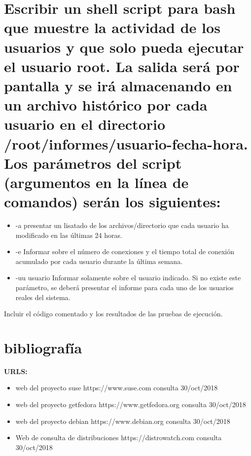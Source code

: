 \documentclass[preprint,11pt]{elsarticle}
\begin{document}
\clearpage
\section{Escribir un shell script para bash que muestre la actividad de los usuarios y que solo pueda ejecutar el usuario root. La salida será por pantalla y se irá almacenando en un archivo histórico por cada usuario en el directorio /root/informes/usuario-fecha-hora. Los parámetros del script (argumentos en la línea de comandos) serán los siguientes:}

\begin{itemize}
    \item-a presentar un lisatado de los archivos/directorio que cada usuario ha modificado en las últimas 24 horas.
    \item-e Informar sobre el número de conexiones y el tiempo total de conexión acumulado por cada usuario durante la última semana.
    \item-uu usuario Informar solamente sobre el usuario indicado. Si no existe este parámetro, se deberá presentar el informe para cada uno de los usuarios reales del sistema.
\end{itemize}

Incluir el código comentado y los resultados de las pruebas de ejecución.























\clearpage
\section{bibliografía}
    \textbf{URLS:}
    \begin{itemize}
        \item web del proyecto suse https://www.suse.com consulta 30/oct/2018
        \item web del proyecto getfedora https://www.getfedora.org consulta 30/oct/2018
        \item web del proyecto debian  https://www.debian.org consulta 30/oct/2018
        \item Web de consulta de distribuciones https://distrowatch.com consulta 30/oct/2018
    \end{itemize}
\end{document}

